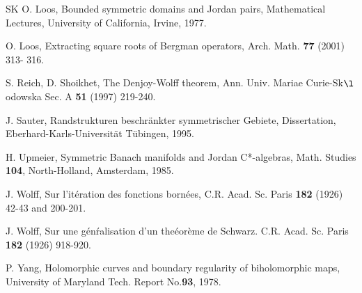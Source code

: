 \documentclass[12pt, twoside]{article}
\theoremstyle{definition}
\numberwithin{equation}{section}
\begin{document}
\begin{thebibliography}{SK}
 O. Loos,    Bounded symmetric domains and Jordan
pairs, Mathematical Lectures,   University of California,
Irvine, 1977.

  O. Loos, Extracting square roots of Bergman operators,
Arch. Math.  \textbf{77}  (2001) 313- 316.

 S. Reich,  D. Shoikhet,   The Denjoy-Wolff theorem,  Ann. Univ. Mariae
Curie-Sk${\l}$odowska Sec. A \textbf{51}  (1997) 219-240.

 J.  Sauter,  Randstrukturen beschr\"ankter symmetrischer Gebiete,
Dissertation, Eberhard-Karls-Universit\"at T\"ubingen, 1995.

 H. Upmeier,   Symmetric Banach manifolds and Jordan
C*-algebras, Math. Studies  \textbf{104}, North-Holland, Amsterdam, 1985.

 J. Wolff,  Sur l'it\'eration des fonctions born\'ees,
C.R. Acad. Sc. Paris  \textbf{182} (1926) 42-43 and 200-201.

 J. Wolff, Sur une g\'en\'ralisation d'un the\'eor\`eme de Schwarz.
 C.R. Acad. Sc. Paris \textbf{182} (1926)  918-920.

 P. Yang,  Holomorphic curves and boundary regularity of biholomorphic
maps, University of Maryland Tech. Report No.\textbf{93}, 1978.

\end{thebibliography}
\end{document}
